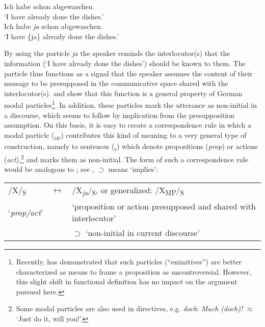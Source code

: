 \documentclass[output=paper]{langscibook}
\begin{document}
\ea 
\ea Ich habe schon abgewaschen.\\
    ‘I have already done the dishes.’ \label{ex:wiemer:23a}  \\

\ex \label{ex:wiemer:23b}  Ich habe \textit{ja} schon abgewaschen.\\
    ‘I have \{ja\} already done the dishes.’\\
\z\z

By using the particle \textit{ja} the speaker reminds the interlocutor(s) that the information (‘I have already done the dishes’) should be known to them. The particle thus functions as a signal that the speaker assumes the content of their message to be presupposed in the communicative space shared with the interlocutor(s). \citet{Diewald2006} and \citet{DiewaldFerraresi2008} show that this function is a general property of German modal particles\footnote{Recently, \citet{Panov2020} has demonstrated that such particles (“enimitives”) are better characterized as means to frame a proposition as uncontroversial. However, this slight shift in functional definition has no impact on the argument pursued here.}. In addition, these particles mark the utterance as non-initial in a discourse, which seems to follow by implication from the presupposition assumption. On this basis, it is easy to create a correspondence rule in which a modal particle (\textsc{\textsubscript{mp}}) contributes this kind of meaning to a very general type of construction, namely to sentences (\textsc{\textsubscript{s}}) which denote propositions (\textit{prop}) or actions (\textit{act}),\footnote{Some modal particles are also used in directives, e.g. \textit{doch}: \textit{Mach (doch)!} ${\approx}$ ‘Just do it, will you!’.} and marks them as non-initial. The form of such a correspondence rule would be analogous to ; see , ${\supset}$ means ‘implies’:

\begin{exe}
    \ex \label{ex:wiemer:23c}
    \begin{tabularx}{.95\linewidth}[t]{@{}lcQ@{}} 
    /X/\textsubscript{S} & ${\leftrightarrow}$  &  /X\textit{\textsubscript{ja}}/\textsubscript{S}, or generalized: /X\textsubscript{MP}/\textsubscript{S}\\
    ‘\textit{prop/act}’  & & ‘proposition or action presupposed and shared with interlocutor’\\
                         & & ${\supset}$ ‘non-initial in current discourse’
    \end{tabularx}
\end{exe}
\end{document}
